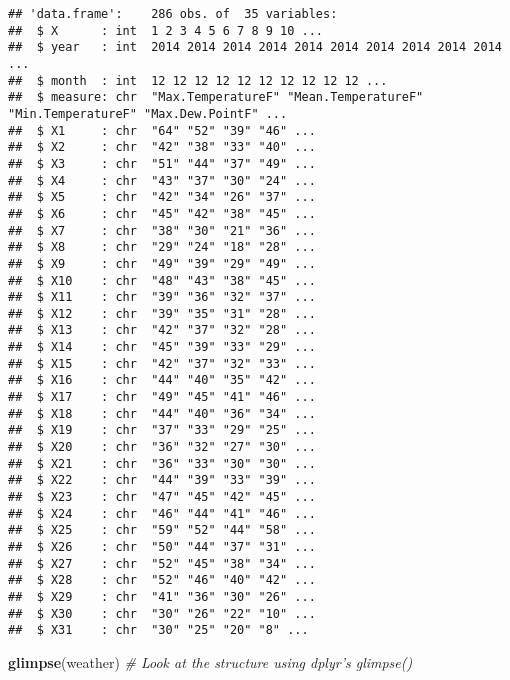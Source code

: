 \documentclass[]{article}
\newenvironment{Shaded}{\begin{snugshade}}{\end{snugshade}}
\newcommand{\KeywordTok}[1]{\textcolor[rgb]{0.13,0.29,0.53}{\textbf{#1}}}
\newcommand{\CommentTok}[1]{\textcolor[rgb]{0.56,0.35,0.01}{\textit{#1}}}
\newcommand{\NormalTok}[1]{#1}
\begin{document}
\begin{verbatim}
## 'data.frame':    286 obs. of  35 variables:
##  $ X      : int  1 2 3 4 5 6 7 8 9 10 ...
##  $ year   : int  2014 2014 2014 2014 2014 2014 2014 2014 2014 2014 ...
##  $ month  : int  12 12 12 12 12 12 12 12 12 12 ...
##  $ measure: chr  "Max.TemperatureF" "Mean.TemperatureF" "Min.TemperatureF" "Max.Dew.PointF" ...
##  $ X1     : chr  "64" "52" "39" "46" ...
##  $ X2     : chr  "42" "38" "33" "40" ...
##  $ X3     : chr  "51" "44" "37" "49" ...
##  $ X4     : chr  "43" "37" "30" "24" ...
##  $ X5     : chr  "42" "34" "26" "37" ...
##  $ X6     : chr  "45" "42" "38" "45" ...
##  $ X7     : chr  "38" "30" "21" "36" ...
##  $ X8     : chr  "29" "24" "18" "28" ...
##  $ X9     : chr  "49" "39" "29" "49" ...
##  $ X10    : chr  "48" "43" "38" "45" ...
##  $ X11    : chr  "39" "36" "32" "37" ...
##  $ X12    : chr  "39" "35" "31" "28" ...
##  $ X13    : chr  "42" "37" "32" "28" ...
##  $ X14    : chr  "45" "39" "33" "29" ...
##  $ X15    : chr  "42" "37" "32" "33" ...
##  $ X16    : chr  "44" "40" "35" "42" ...
##  $ X17    : chr  "49" "45" "41" "46" ...
##  $ X18    : chr  "44" "40" "36" "34" ...
##  $ X19    : chr  "37" "33" "29" "25" ...
##  $ X20    : chr  "36" "32" "27" "30" ...
##  $ X21    : chr  "36" "33" "30" "30" ...
##  $ X22    : chr  "44" "39" "33" "39" ...
##  $ X23    : chr  "47" "45" "42" "45" ...
##  $ X24    : chr  "46" "44" "41" "46" ...
##  $ X25    : chr  "59" "52" "44" "58" ...
##  $ X26    : chr  "50" "44" "37" "31" ...
##  $ X27    : chr  "52" "45" "38" "34" ...
##  $ X28    : chr  "52" "46" "40" "42" ...
##  $ X29    : chr  "41" "36" "30" "26" ...
##  $ X30    : chr  "30" "26" "22" "10" ...
##  $ X31    : chr  "30" "25" "20" "8" ...
\end{verbatim}

\begin{Shaded}
\begin{Highlighting}[]
\KeywordTok{glimpse}\NormalTok{(weather) }\CommentTok{# Look at the structure using dplyr's glimpse()}
\end{Highlighting}
\end{Shaded}
\end{document}
